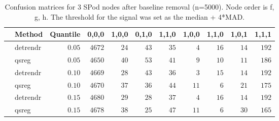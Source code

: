 \begin{table}[!tbp]
\caption{Confusion matrices for 3 SPod nodes after baseline 
      removal (n=5000). Node order is f, g, h. The threshold for the signal was 
      set as the median + 4*MAD.\label{confusion}} 
\begin{center}
\begin{tabular}{llrrrrrrrrr}
\hline\hline
\multicolumn{1}{l}{}&\multicolumn{1}{c}{Method}&\multicolumn{1}{c}{Quantile}&\multicolumn{1}{c}{0,0,0}&\multicolumn{1}{c}{1,0,0}&\multicolumn{1}{c}{0,1,0}&\multicolumn{1}{c}{1,1,0}&\multicolumn{1}{c}{1,0,0}&\multicolumn{1}{c}{1,1,0}&\multicolumn{1}{c}{1,0,1}&\multicolumn{1}{c}{1,1,1}\tabularnewline
\hline
&detrendr&$0.05$&$4672$&$24$&$43$&$35$&$ 4$&$16$&$14$&$192$\tabularnewline
&qsreg&$0.05$&$4650$&$40$&$53$&$41$&$ 9$&$10$&$11$&$186$\tabularnewline
&detrendr&$0.10$&$4669$&$28$&$43$&$36$&$ 3$&$15$&$14$&$192$\tabularnewline
&qsreg&$0.10$&$4670$&$37$&$36$&$44$&$11$&$ 6$&$21$&$175$\tabularnewline
&detrendr&$0.15$&$4680$&$29$&$28$&$37$&$ 4$&$16$&$14$&$192$\tabularnewline
&qsreg&$0.15$&$4678$&$38$&$25$&$47$&$11$&$ 6$&$30$&$165$\tabularnewline
\hline
\end{tabular}\end{center}
\end{table}
